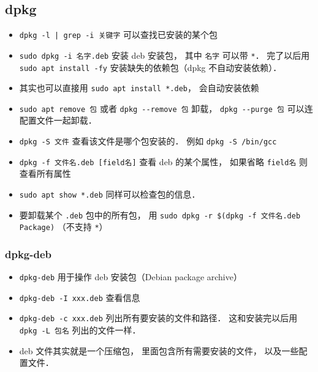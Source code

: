 \subsection{dpkg}
\begin{itemize}
\item \verb`dpkg -l | grep -i 关键字` 可以查找已安装的某个包
\item \verb|sudo dpkg -i 名字.deb| 安装 deb 安装包， 其中 \verb|名字| 可以带 \verb|*|． 完了以后用 \verb|sudo apt install -fy| 安装缺失的依赖包（dpkg 不自动安装依赖）．
\item 其实也可以直接用 \verb|sudo apt install *.deb|， 会自动安装依赖
\item \verb|sudo apt remove 包| 或者 \verb|dpkg --remove 包| 卸载， \verb|dpkg --purge 包| 可以连配置文件一起卸载．
\item \verb|dpkg -S 文件| 查看该文件是哪个包安装的． 例如 \verb|dpkg -S /bin/gcc|
\item \verb|dpkg -f 文件名.deb [field名]| 查看 deb 的某个属性， 如果省略 \verb|field名| 则查看所有属性
\item \verb|sudo apt show *.deb| 同样可以检查包的信息．
\item 要卸载某个 \verb|.deb| 包中的所有包， 用 \verb|sudo dpkg -r $(dpkg -f 文件名.deb Package)| （不支持 \verb|*|）
\end{itemize}

\subsubsection{dpkg-deb}
\begin{itemize}
\item \verb|dpkg-deb| 用于操作 deb 安装包（Debian package archive）
\item \verb|dpkg-deb -I xxx.deb| 查看信息
\item \verb|dpkg-deb -c xxx.deb| 列出所有要安装的文件和路径． 这和安装完以后用 \verb|dpkg -L 包名| 列出的文件一样．
\item deb 文件其实就是一个压缩包， 里面包含所有需要安装的文件， 以及一些配置文件．
\end{itemize}


